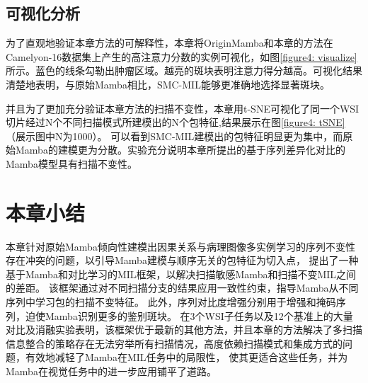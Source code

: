 \subsection[\hspace{-2pt}可视化分析]{{\heiti{} \hspace{-8pt}可视化分析}}\label{section4: 可视化分析}






为了直观地验证本章方法的可解释性，本章将OriginMamba和本章的方法在Camelyon-16数据集上产生的高注意力分数的实例可视化，如图\ref{figure4: visualize}所示。蓝色的线条勾勒出肿瘤区域。越亮的斑块表明注意力得分越高。可视化结果清楚地表明，与原始Mamba相比，SMC-MIL能够更准确地选择显著斑块。
 
并且为了更加充分验证本章方法的扫描不变性，本章用t-SNE可视化了同一个WSI切片经过N个不同扫描模式所建模出的N个包特征,结果展示在图\ref{figure4: tSNE}（展示图中N为1000）。
可以看到SMC-MIL建模出的包特征明显更为集中，而原始Mamba的建模更为分散。实验充分说明本章所提出的基于序列差异化对比的Mamba模型具有扫描不变性。

\section[\hspace{-2pt}本章小结]{{\heiti{} \hspace{-8pt}本章小结}}\label{section4: 本章小结}

本章针对原始Mamba倾向性建模出因果关系与病理图像多实例学习的序列不变性存在冲突的问题，以引导Mamba建模与顺序无关的包特征为切入点，
提出了一种基于Mamba和对比学习的MIL框架，以解决扫描敏感Mamba和扫描不变MIL之间的差距。
该框架通过对不同扫描分支的结果应用一致性约束，指导Mamba从不同序列中学习包的扫描不变特征。
此外，序列对比度增强分别用于增强和掩码序列，迫使Mamba识别更多的鉴别斑块。
在3个WSI子任务以及12个基准上的大量对比及消融实验表明，该框架优于最新的其他方法，并且本章的方法解决了多扫描信息整合的策略存在无法穷举所有扫描情况，高度依赖扫描模式和集成方式的问题，有效地减轻了Mamba在MIL任务中的局限性，
使其更适合这些任务，并为Mamba在视觉任务中的进一步应用铺平了道路。
